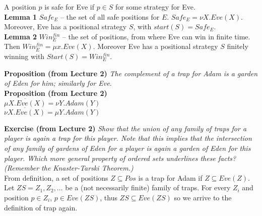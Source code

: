 \noindent
A position $p$ is safe for Eve if $p \in S$ for some strategy for Eve.\\
\textbf{Lemma 1} $Safe_E$ -- the set of all safe positions for $E$. $Safe_E = \nu X . Eve(X)$.
Moreover, Eve has a positional strategy $S$, with $start(S) = Safe_E$.\\
\textbf{Lemma 2} $Win^{fin}_{E}$ -- the set of positions, from where Eve can win in finite time.
Then $Win^{fin}_{E} = \mu x. Eve(X)$. Moreover Eve has a positional strategy $S$ finitely winning
with $Start(S) = Win^{fin}_{E}$.

\noindent
\textbf{Proposition (from Lecture 2)} \textit{The complement of a trap for Adam is a garden of Eden for him; similarly for Eve.}\\
\textbf{Proposition (from Lecture 2)}\\
$\overline{\mu X . Eve(X)} = \nu Y . Adam(Y)$\\
$\overline{\nu X . Eve(X)} = \mu Y . Adam(Y)$

\noindent
\textbf{Exercise (from Lecture 2)} \textit{Show that the union of any family of traps for a player is again a trap for this player. Note that this
implies that the intersection of any family of gardens of Eden for a player is again a garden of Eden for this player. Which more general property
of ordered sets underlines these facts? (Remember the Knaster-Tarski Theorem.)}\\
From definition, a set of positions $Z \subseteq Pos$ is a trap for Adam if $Z \subseteq Eve(Z)$. Let $ZS = Z_1, Z_2, ...$ be a (not necessarily finite)
family of traps. For every $Z_i$ and position $p \in Z_i$, $p \in Eve(ZS)$, thus $ZS \subseteq Eve(ZS)$ so we arrive to the definition of trap again.
